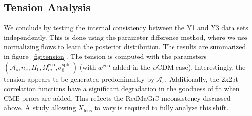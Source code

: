 \subsection{Tension Analysis}
We conclude by testing the internal consistency between the Y1 and Y3 data sets independently. This is done using the parameter difference method, where we use normalizing flows to learn the posterior distribution. The results are summarized in figure~\ref{fig:tension}. The tension is computed with the parameters $(\mathcal{A}_s,n_s,H_0,\Omega_m^{\mathrm{geo}},\sigma_8^\mathrm{split})$ (with $w^{\mathrm{geo}}$ added in the $w$CDM case). Interestingly, the tension appears to be generated predominantly by $\mathcal{A}_s$. Additionally, the 2x2pt correlation functions have a significant degradation in the goodness of fit when CMB priors are added. This reflects the RedMaGiC inconsistency discussed above. A study allowing $X_\mathrm{lens}$ to vary is required to fully analyze this shift.

